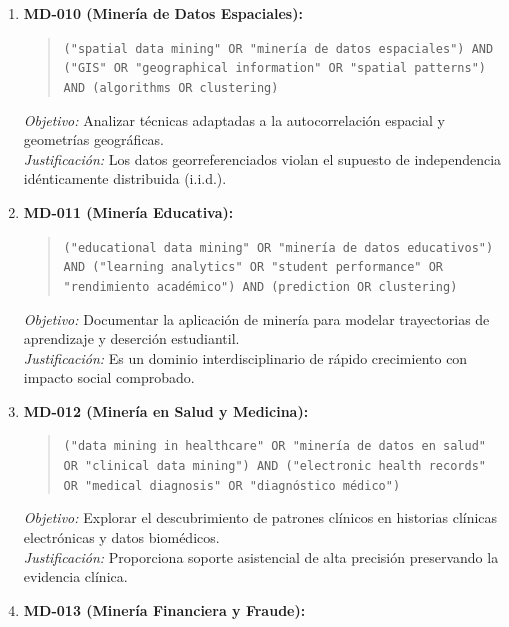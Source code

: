 \begin{enumerate}
  \begin{quote}
  \texttt{("stream data mining" OR "data stream" OR "flujos de datos") AND ("concept drift" OR "cambio de concepto") AND ("sliding window" OR adaptive)}
  \end{quote}
  \textit{Objetivo:} Investigar la minería en tiempo real sobre flujos infinitos de datos y mecanismos adaptativos ante deriva de concepto.\\
  \textit{Justificación:} Los entornos contemporáneos de IoT y streaming demandan procesamiento incremental continuo.
  \item \textbf{MD-010 (Minería de Datos Espaciales):}
  \begin{quote}
  \texttt{("spatial data mining" OR "minería de datos espaciales") AND ("GIS" OR "geographical information" OR "spatial patterns") AND (algorithms OR clustering)}
  \end{quote}
  \textit{Objetivo:} Analizar técnicas adaptadas a la autocorrelación espacial y geometrías geográficas.\\
  \textit{Justificación:} Los datos georreferenciados violan el supuesto de independencia idénticamente distribuida (i.i.d.).
  \item \textbf{MD-011 (Minería Educativa):}
  \begin{quote}
  \texttt{("educational data mining" OR "minería de datos educativos") AND ("learning analytics" OR "student performance" OR "rendimiento académico") AND (prediction OR clustering)}
  \end{quote}
  \textit{Objetivo:} Documentar la aplicación de minería para modelar trayectorias de aprendizaje y deserción estudiantil.\\
  \textit{Justificación:} Es un dominio interdisciplinario de rápido crecimiento con impacto social comprobado.
  \item \textbf{MD-012 (Minería en Salud y Medicina):}
  \begin{quote}
  \texttt{("data mining in healthcare" OR "minería de datos en salud" OR "clinical data mining") AND ("electronic health records" OR "medical diagnosis" OR "diagnóstico médico")}
  \end{quote}
  \textit{Objetivo:} Explorar el descubrimiento de patrones clínicos en historias clínicas electrónicas y datos biomédicos.\\
  \textit{Justificación:} Proporciona soporte asistencial de alta precisión preservando la evidencia clínica.
  \item \textbf{MD-013 (Minería Financiera y Fraude):}

\end{enumerate}
